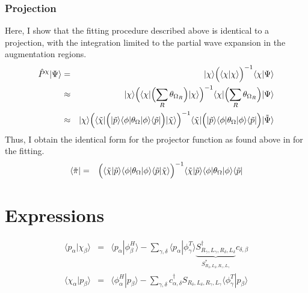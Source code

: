 \documentclass[11pt,a4paper]{report}
\begin{document}
\subsubsection{Projection}
Here, I show that the fitting procedure described above is identical to
a projection, with the integration limited to the partial wave
expansion in the augmentation regions.
\begin{eqnarray}
\hat{P}^\chi|\Psi\rangle
&=&|\chi\rangle\Bigl(\langle\chi|\chi\rangle\Bigr)^{-1}
\langle\chi|\Psi\rangle
\nonumber\\
%
%
&\approx&|\chi\rangle\Bigl(\langle\chi|
\Bigl(\sum_R \theta_{\Omega_R}\Bigr)
|\chi\rangle\Bigr)^{-1}
\langle\chi|\Bigl(\sum_R \theta_{\Omega_R}\Bigr)|\Psi\rangle
\nonumber\\
%
%
&\approx&|\chi\rangle\Bigl(\langle\tilde{\chi}|
\Bigl(
|\tilde{p}\rangle\langle\phi|\theta_{\Omega}|\phi\rangle\langle\tilde{p}|
\Bigr)
|\tilde{\chi}\rangle\Bigr)^{-1}
\langle\tilde{\chi}|
\Bigl(
|\tilde{p}\rangle\langle\phi|\theta_{\Omega}|\phi\rangle\langle\tilde{p}|
\Bigr)|\tilde{\Psi}\rangle
\end{eqnarray}
Thus, I obtain the identical form for the projector function as found
above in  for the fitting.
\begin{eqnarray}
\langle\tilde{\pi}|&=&\Bigl(\langle\tilde{\chi}|\tilde{p}\rangle
\langle\phi|\theta_\Omega|\phi\rangle
\langle\tilde{p}|\tilde{\chi}\rangle\Bigr)^{-1}
\langle\tilde{\chi}|\tilde{p}\rangle
\langle\phi|\theta_\Omega|\phi\rangle
\langle\tilde{p}|
\end{eqnarray}


\section{Expressions}

\begin{eqnarray}
\langle{p}_\alpha|\chi_\beta\rangle&=&
\langle{p}_\alpha|\phi^H_\beta\rangle
-
\sum_{\gamma,\delta}
\langle{p}_\alpha|\phi^T_{\gamma}\rangle 
\underbrace{S^\dagger_{R_\gamma,L_\gamma,R_\delta,L_\delta}
}_{S^*_{R_\delta,L_\delta,R_\gamma,L_\gamma}}
c_{\delta,\beta}
\nonumber\\
%
\langle{\chi}_\alpha|p_\beta\rangle&=&
\langle\phi^H_\alpha|p_\beta\rangle
-
\sum_{\gamma,\delta}
c^\dagger_{\alpha,\delta}
S_{R_\delta,L_\delta,R_\gamma,L_\gamma}
\langle\phi^T_\gamma|p_{\beta}\rangle 
\end{eqnarray}
\end{document}
